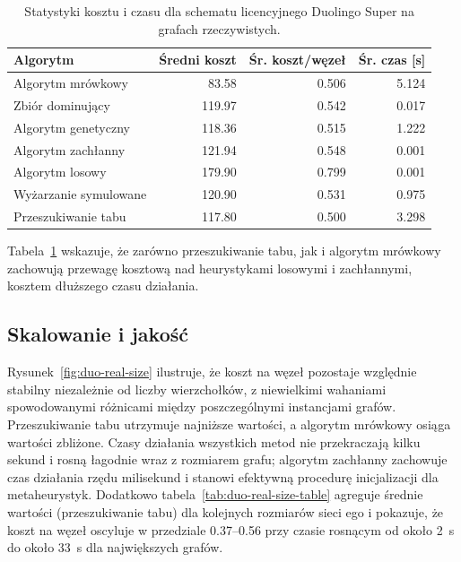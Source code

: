 \begin{table}[H]
  \centering
  \caption{Statystyki kosztu i czasu dla schematu licencyjnego Duolingo Super na grafach rzeczywistych.}
  \label{tab:duo-real-alg}
  \begin{tabular}{lrrr}
    \toprule
    \textbf{Algorytm}     & \textbf{Średni koszt} & \textbf{Śr. koszt/węzeł} & \textbf{Śr. czas [s]} \\
    \midrule
    Algorytm mrówkowy     & 83.58                 & 0.506                    & 5.124                 \\
    Zbiór dominujący      & 119.97                & 0.542                    & 0.017                 \\
    Algorytm genetyczny   & 118.36                & 0.515                    & 1.222                 \\
    Algorytm zachłanny    & 121.94                & 0.548                    & 0.001                 \\
    Algorytm losowy       & 179.90                & 0.799                    & 0.001                 \\
    Wyżarzanie symulowane & 120.90                & 0.531                    & 0.975                 \\
    Przeszukiwanie tabu   & 117.80                & 0.500                    & 3.298                 \\
    \bottomrule
  \end{tabular}
\end{table}
Tabela~\ref{tab:duo-real-alg} wskazuje, że zarówno przeszukiwanie tabu, jak i algorytm mrówkowy zachowują przewagę kosztową nad heurystykami losowymi i zachłannymi, kosztem dłuższego czasu działania.

\subsection{Skalowanie i jakość}

Rysunek~\ref{fig:duo-real-size} ilustruje, że koszt na węzeł pozostaje względnie stabilny niezależnie od liczby wierzchołków, z niewielkimi wahaniami spowodowanymi różnicami między poszczególnymi instancjami grafów. Przeszukiwanie tabu utrzymuje najniższe wartości, a algorytm mrówkowy osiąga wartości zbliżone. Czasy działania wszystkich metod nie przekraczają kilku sekund i rosną łagodnie wraz z rozmiarem grafu; algorytm zachłanny zachowuje czas działania rzędu milisekund i stanowi efektywną procedurę inicjalizacji dla metaheurystyk. Dodatkowo tabela~\ref{tab:duo-real-size-table} agreguje średnie wartości (przeszukiwanie tabu) dla kolejnych rozmiarów sieci ego i pokazuje, że koszt na węzeł oscyluje w przedziale 0.37--0.56 przy czasie rosnącym od około 2~s do około 33~s dla największych grafów.

